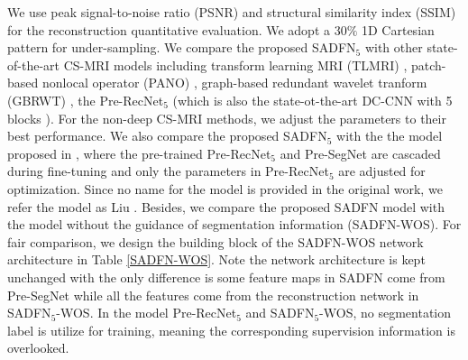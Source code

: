 \documentclass[runningheads]{llncs}
\begin{document}
We use peak signal-to-noise ratio (PSNR) and structural similarity index (SSIM) \cite{31} for the reconstruction quantitative evaluation. We adopt a 30$\%$ 1D Cartesian pattern for under-sampling. We compare the proposed SADFN$_5$ with other state-of-the-art CS-MRI models including transform learning MRI (TLMRI) \cite{12}, patch-based nonlocal operator (PANO) \cite{10}, graph-based redundant wavelet tranform (GBRWT) \cite{11}, the Pre-RecNet$_5$ (which is also the state-ot-the-art DC-CNN with 5 blocks \cite{4}). For the non-deep CS-MRI methods, we adjust the parameters to their best performance. We also compare the proposed SADFN$_5$ with the the model proposed in \cite{27}, where the pre-trained Pre-RecNet$_5$ and Pre-SegNet are cascaded during fine-tuning and only the parameters in Pre-RecNet$_5$ are adjusted for optimization. Since no name for the model is provided in the original work, we refer the model as Liu \cite{27}. Besides, we compare the proposed SADFN model with the model without the guidance of segmentation information (SADFN-WOS). For fair comparison, we design the building block of the SADFN-WOS network architecture in Table \ref{SADFN-WOS}. Note the network architecture is kept unchanged with the only difference is some feature maps in SADFN come from Pre-SegNet while all the features come from the reconstruction network in SADFN$_5$-WOS. In the model Pre-RecNet$_5$ and SADFN$_5$-WOS, no segmentation label is utilize for training, meaning the corresponding supervision information is overlooked.
\end{document}
